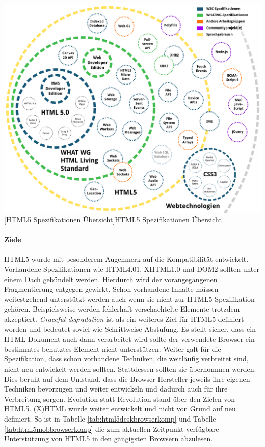 \documentclass[12pt,a4paper,bibliography=totocnumbered,listof=totocnumbered]{scrartcl}
\begin{document}
	\vspace{1em}
	\begin{minipage}{\linewidth}
		\centering
		\includegraphics[width=0.98\linewidth]{images/html5_specs.png}
		[HTML5 Spezifikationen Übersicht]{HTML5 Spezifikationen Übersicht}
		\label{fig:html5specs}
	\end{minipage}

\paragraph{Ziele} \ac{HTML}5 wurde mit besonderem Augenmerk auf die Kompatibilität entwickelt. Vorhandene Spezifikationen wie \ac{HTML}4.01, \ac{XHTML}1.0 und \ac{DOM}2 sollten unter einem Dach gebündelt werden. Hierdurch wird der vorangegangenen Fragmentierung entgegen gewirkt. Schon vorhandene Inhalte müssen weitestgehend unterstützt werden auch wenn sie nicht zur \ac{HTML}5 Spezifikation gehören. Beispielsweise werden fehlerhaft verschachtelte Elemente trotzdem akzeptiert. \textit{Graceful degradation} ist als ein weiteres Ziel für HTML5 definiert worden und bedeutet soviel wie \glqq Schrittweise Abstufung\grqq{}. Es stellt sicher, dass ein HTML Dokument auch dann verarbeitet wird sollte der verwendete Browser ein bestimmtes benutztes Element nicht unterstützen. Weiter galt für die Spezifikation, dass schon vorhandene Techniken, die weitläufig verbreitet sind, nicht neu entwickelt werden sollten. Stattdessen sollten sie übernommen werden. Dies beruht auf dem Umstand, dass die Browser Hersteller jeweils ihre eigenen Techniken bevorzugen und weiter entwickeln und dadurch auch für ihre Verbreitung sorgen. Evolution statt Revolution stand über den Zielen von HTML5. (X)HTML wurde weiter entwickelt und nicht von Grund auf neu definiert. So ist in Tabelle \ref{tab:html5deskbrowserkomp} und Tabelle \ref{tab:html5mobbrowserkomp} die zum aktuellen Zeitpunkt verfügbare Unterstützung von HTML5 in den gängigsten Browsern abzulesen.
\end{document}
